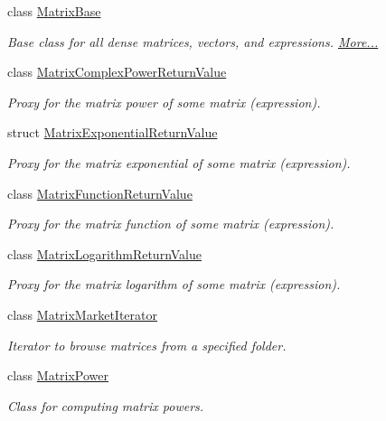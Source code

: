 \begin{DoxyCompactItemize}
class \hyperlink{group___core___module_class_eigen_1_1_matrix_base}{Matrix\+Base}
\begin{DoxyCompactList}\small\item\em Base class for all dense matrices, vectors, and expressions.  \hyperlink{group___core___module_class_eigen_1_1_matrix_base}{More...}\end{DoxyCompactList}\item 
class \hyperlink{class_eigen_1_1_matrix_complex_power_return_value}{Matrix\+Complex\+Power\+Return\+Value}
\begin{DoxyCompactList}\small\item\em Proxy for the matrix power of some matrix (expression). \end{DoxyCompactList}\item 
struct \hyperlink{struct_eigen_1_1_matrix_exponential_return_value}{Matrix\+Exponential\+Return\+Value}
\begin{DoxyCompactList}\small\item\em Proxy for the matrix exponential of some matrix (expression). \end{DoxyCompactList}\item 
class \hyperlink{class_eigen_1_1_matrix_function_return_value}{Matrix\+Function\+Return\+Value}
\begin{DoxyCompactList}\small\item\em Proxy for the matrix function of some matrix (expression). \end{DoxyCompactList}\item 
class \hyperlink{class_eigen_1_1_matrix_logarithm_return_value}{Matrix\+Logarithm\+Return\+Value}
\begin{DoxyCompactList}\small\item\em Proxy for the matrix logarithm of some matrix (expression). \end{DoxyCompactList}\item 
class \hyperlink{class_eigen_1_1_matrix_market_iterator}{Matrix\+Market\+Iterator}
\begin{DoxyCompactList}\small\item\em Iterator to browse matrices from a specified folder. \end{DoxyCompactList}\item 
class \hyperlink{class_eigen_1_1_matrix_power}{Matrix\+Power}
\begin{DoxyCompactList}\small\item\em Class for computing matrix powers. \end{DoxyCompactList}\item 

\end{DoxyCompactItemize}
